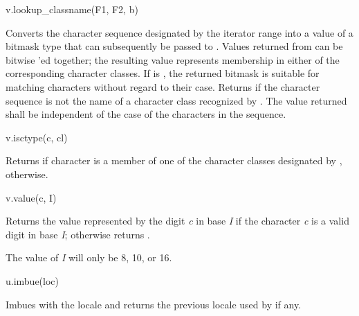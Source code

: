 \begin{itemdecl}
v.lookup_classname(F1, F2, b)
\end{itemdecl}

\begin{itemdescr}
\pnum
\result
{}

\pnum
\returns
Converts the character sequence designated by the iterator range
 into a value of a bitmask type that can
subsequently be passed to .
Values returned from  can be bitwise 'ed together;
the resulting value represents membership
in either of the corresponding character classes.
If  is , the returned bitmask is suitable for
matching characters without regard to their case.
Returns 
if the character sequence is not the name of
a character class recognized by  .
The value returned shall be independent of
the case of the characters in the sequence.
\end{itemdescr}

\begin{itemdecl}
v.isctype(c, cl)
\end{itemdecl}

\begin{itemdescr}
\pnum
\result
{}

\pnum
\returns
Returns  if character  is a member of
one of the character classes designated by ,
 otherwise.
\end{itemdescr}

\begin{itemdecl}
v.value(c, I)
\end{itemdecl}

\begin{itemdescr}
\pnum
\result
{}

\pnum
\returns
Returns the value represented by the digit \textit{c} in base
\textit{I} if the character \textit{c} is a valid digit in base \textit{I};
otherwise returns .
\begin{note}
The value of \textit{I} will only be 8, 10, or 16.
\end{note}
\end{itemdescr}

\begin{itemdecl}
u.imbue(loc)
\end{itemdecl}

\begin{itemdescr}
\pnum
\result
{}

%
\pnum
\effects
Imbues  with the locale  and
returns the previous locale used by  if any.
\end{itemdescr}

